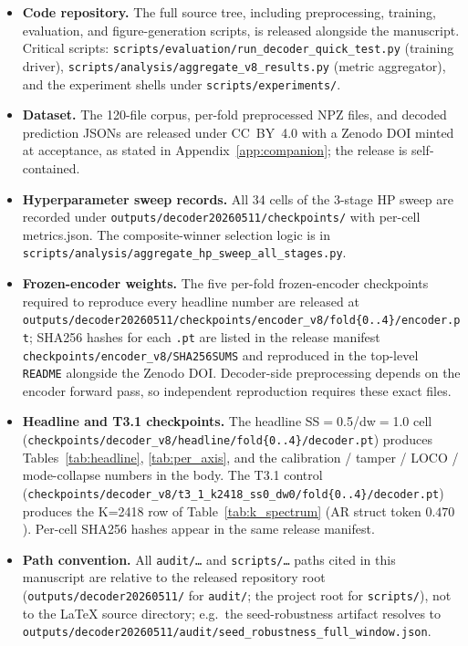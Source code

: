\begin{itemize}
\item \textbf{Code repository.} The full source tree, including
preprocessing, training, evaluation, and figure-generation scripts, is
released alongside the manuscript. Critical scripts:
\texttt{scripts/\allowbreak evaluation/\allowbreak run\_decoder\_quick\_test.py} (training
driver), \texttt{scripts/\allowbreak analysis/\allowbreak aggregate\_v8\_results.py}
(metric aggregator), and the experiment shells under
\texttt{scripts/experiments/}.
\item \textbf{Dataset.} The 120-file corpus, per-fold preprocessed NPZ
files, and decoded prediction JSONs are released under CC~BY~4.0 with a
Zenodo DOI minted at acceptance, as stated in
Appendix~\ref{app:companion}; the release is self-contained.
\item \textbf{Hyperparameter sweep records.} All 34 cells of the 3-stage
HP sweep are recorded under \texttt{outputs/\allowbreak decoder20260511/\allowbreak checkpoints/}
with per-cell metrics.json. The composite-winner selection logic is in
\texttt{scripts/\allowbreak analysis/\allowbreak aggregate\_hp\_sweep\_all\_stages.py}.
\item \textbf{Frozen-encoder weights.} The five per-fold frozen-encoder
checkpoints required to reproduce every headline number are released at
\texttt{outputs/\allowbreak decoder20260511/\allowbreak checkpoints/\allowbreak encoder\_v8/\allowbreak fold\{0..4\}/\allowbreak encoder.pt};
SHA256 hashes for each \texttt{.pt} are listed in the release manifest
\texttt{checkpoints/\allowbreak encoder\_v8/SHA256SUMS} and reproduced in the
top-level \texttt{README} alongside the Zenodo DOI. Decoder-side
preprocessing depends on the encoder forward pass, so independent
reproduction requires these exact files.
\item \textbf{Headline and T3.1 checkpoints.} The headline
SS$=$0.5/dw$=$1.0 cell (\texttt{checkpoints/\allowbreak decoder\_v8/\allowbreak headline/\allowbreak fold\{0..4\}/\allowbreak decoder.pt})
produces Tables~\ref{tab:headline}, \ref{tab:per_axis}, and the
calibration / tamper / LOCO / mode-collapse numbers in the body. The
T3.1 control (\texttt{checkpoints/\allowbreak decoder\_v8/\allowbreak t3\_1\_k2418\_ss0\_dw0/\allowbreak fold\{0..4\}/\allowbreak decoder.pt})
produces the K=2418 row of Table~\ref{tab:k_spectrum} (AR struct token
$0.470$). Per-cell SHA256 hashes appear in the same release manifest.
\item \textbf{Path convention.} All \texttt{audit/\ldots} and
\texttt{scripts/\ldots} paths cited in this manuscript are relative to the
released repository root (\texttt{outputs/decoder20260511/} for
\texttt{audit/}; the project root for \texttt{scripts/}), not to the
LaTeX source directory; e.g.\ the seed-robustness artifact resolves to
\texttt{outputs/\allowbreak decoder20260511/\allowbreak audit/\allowbreak seed\_robustness\_full\_window.json}.
\end{itemize}

